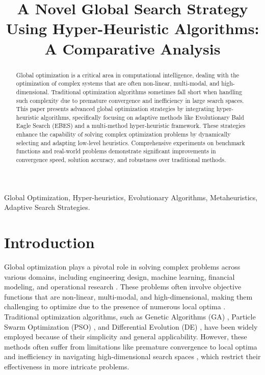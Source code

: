 \documentclass[conference]
{IEEEtran}
\title{A Novel Global Search Strategy Using Hyper-Heuristic Algorithms: A Comparative Analysis}
\author{
\IEEEauthorblockN{Tse-Lin Li}
\IEEEauthorblockA{
\textit{Department of Computer Science}\\
\textit{Fu Jen Catholic University}\\
New Taipei, Taiwan \\
511172176@m365.fju.edu.tw}
}
\begin{document}
\maketitle

\begin{abstract}
Global optimization is a critical area in computational intelligence, dealing with the optimization of complex systems that are often non-linear, multi-modal, and high-dimensional. Traditional optimization algorithms sometimes fall short when handling such complexity due to premature convergence and inefficiency in large search spaces. This paper presents advanced global optimization strategies by integrating hyper-heuristic algorithms, specifically focusing on adaptive methods like Evolutionary Bald Eagle Search (EBES) and a multi-method hyper-heuristic framework. These strategies enhance the capability of solving complex optimization problems by dynamically selecting and adapting low-level heuristics. Comprehensive experiments on benchmark functions and real-world problems demonstrate significant improvements in convergence speed, solution accuracy, and robustness over traditional methods.
\end{abstract}

\begin{IEEEkeywords}
Global Optimization, Hyper-heuristics, Evolutionary Algorithms, Metaheuristics, Adaptive Search Strategies.
\end{IEEEkeywords}

\section{Introduction}

Global optimization plays a pivotal role in solving complex problems across various domains, including engineering design, machine learning, financial modeling, and operational research \cite{floudas1999review}. These problems often involve objective functions that are non-linear, multi-modal, and high-dimensional, making them challenging to optimize due to the presence of numerous local optima \cite{pinter1996global}. Traditional optimization algorithms, such as Genetic Algorithms (GA) \cite{goldberg1989genetic}, Particle Swarm Optimization (PSO) \cite{kennedy1995particle}, and Differential Evolution (DE) \cite{storn1997differential}, have been widely employed because of their simplicity and general applicability. However, these methods often suffer from limitations like premature convergence to local optima and inefficiency in navigating high-dimensional search spaces \cite{eiben1999parameter}, which restrict their effectiveness in more intricate problems.
\end{document}
